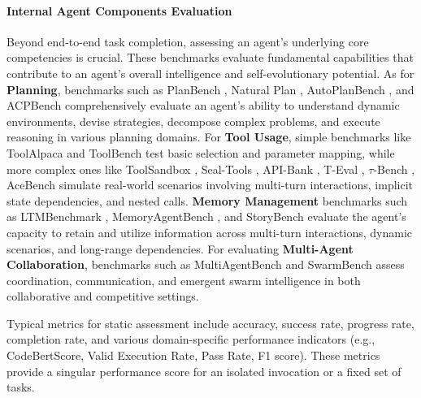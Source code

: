 \paragraph{Internal Agent Components Evaluation}
Beyond end-to-end task completion, assessing an agent's underlying core competencies is crucial. These benchmarks evaluate fundamental capabilities that contribute to an agent's overall intelligence and self-evolutionary potential. As for \textbf{Planning}, benchmarks such as PlanBench \citep{valmeekam2023planbench}, Natural Plan \citep{zheng2024natural}, AutoPlanBench \citep{stein2025automating}, and ACPBench \citep{kokel2025acpbench} comprehensively evaluate an agent's ability to understand dynamic environments, devise strategies, decompose complex problems, and execute reasoning in various planning domains. For \textbf{Tool Usage}, 
simple benchmarks like ToolAlpaca \citep{tang2023toolalpaca} and ToolBench \citep{qin2023toolllm} test basic selection and parameter mapping, while more complex ones like 
ToolSandbox \citep{lu2024toolsandbox}, Seal-Tools \citep{wu2024seal}, API-Bank \citep{li2023api}, T-Eval \citep{chen2023t}, $\tau$-Bench \citep{yao2024tau}, AceBench \citep{chen2025acebench} simulate real-world scenarios involving multi-turn interactions, implicit state dependencies, and nested calls. \textbf{Memory Management} benchmarks such as LTMBenchmark \citep{castillo-bolado2024beyond}, MemoryAgentBench \citep{hu2025evaluating}, and StoryBench \citep{wan2025storybench} evaluate the agent's capacity to retain and utilize information across multi-turn interactions, dynamic scenarios, and long-range dependencies. For evaluating \textbf{Multi-Agent Collaboration}, benchmarks such as MultiAgentBench \citep{zhu2025multiagentbench} and SwarmBench \citep{ruan2025benchmarking} assess coordination, communication, and emergent swarm intelligence in both collaborative and competitive settings.

Typical metrics for static assessment include accuracy, success rate, progress rate, completion rate, and various domain-specific performance indicators (e.g., {CodeBertScore}, Valid Execution Rate, Pass Rate, F1 score). These metrics provide a singular performance score for an isolated invocation or a fixed set of tasks.

